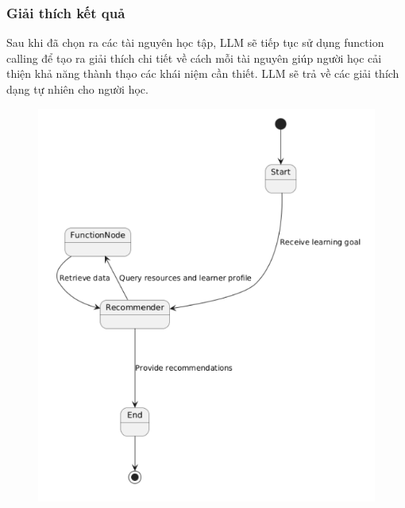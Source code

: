 \subsubsection{ Giải thích kết quả}
Sau khi đã chọn ra các tài nguyên học tập, LLM sẽ tiếp tục sử dụng function calling để tạo ra giải thích chi tiết về cách mỗi tài nguyên giúp người học cải thiện khả năng thành thạo các khái niệm cần thiết. LLM sẽ trả về các giải thích dạng tự nhiên cho người học.
\begin{figure}[H]
    \centering
    \includegraphics[width=0.7\linewidth]{Images/Anh/giaithuat.png}
    
    \label{fig:enter-label}
\end{figure}
